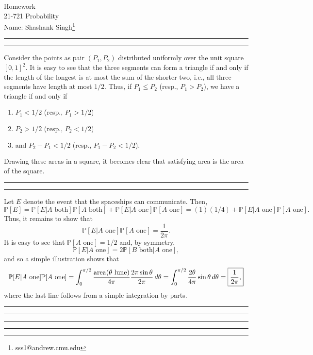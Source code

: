 \documentclass[11pt]{article}
\makeatletter
\newcounter{questionCounter}
\newcounter{partCounter}[questionCounter]
\newenvironment{question}[2][\arabic{questionCounter}]{%
    \setcounter{partCounter}{0}%
    \vspace{.25in} \hrule \vspace{0.5em}%
        \noindent{\bf #2}%
    \vspace{0.8em} \hrule \vspace{.10in}%
    \addtocounter{questionCounter}{1}%
}{}
\newcommand{\myname}{Shashank Singh\footnote{sss1@andrew.cmu.edu}}
\newcommand{\myclass}{21-721 Probability}
\newcommand{\area}{\operatorname{area}}
\renewcommand{\P}{\mathbb{P}}   %
\makeatother
\begin{document}
\thispagestyle{plain}

{\Large Homework} \\
\myclass \\
Name: \myname \\

\begin{question}{EG.1}
Consider the points as pair $(P_1,P_2)$ distributed uniformly over the unit
square $[0,1]^2$. It is easy to see that the three segments can form a triangle
if and only if the length of the longest is at most the sum of the shorter two,
i.e., all three segments have length at most $1/2$. Thus, if $P_1 \leq P_2$
(resp., $P_1 > P_2$), we have a triangle if and only if
\begin{enumerate}
\item $P_1 < 1/2$ (resp., $P_1 > 1/2$)
\item $P_2 > 1/2$ (resp., $P_2 < 1/2$)
\item and $P_2 - P_1 < 1/2$ (resp., $P_1 - P_2 < 1/2$).
\end{enumerate}
Drawing these areas in a square, it becomes clear that satisfying area is
 the area of the square.
\end{question}

\begin{question}{EG.2}
Let $E$ denote the event that the spaceships can communicate. Then,
\[\P[E]
    = \P[E | A \mbox{ both}] \P[A \mbox{ both}]
    + \P[E | A \mbox{ one}] \P[A \mbox{ one}]
    = (1)(1/4)
    + \P[E | A \mbox{ one}] \P[A \mbox{ one}].
\]
Thus, it remains to show that
\[\P[E | A \mbox{ one}] \P[A \mbox{ one}]
    = \frac{1}{2\pi}.
\]
It is easy to see that $\P[A \mbox{ one}] = 1/2$ and, by symmetry,
\[\P[E | A \mbox{ one}]
    = 2 \P[B \mbox{ both} | A \mbox{ one}],
\]
and so a simple illustration shows that
\[\P[E | A \mbox{ one}] \P[A \mbox{ one}]
    = \int_0^{\pi/2} \frac{\area(\theta \mbox{ lune})}{4\pi}
                                    \frac{2\pi\sin\theta}{2\pi}   \, d\theta
    = \int_0^{\pi/2} \frac{2\theta}{4\pi} \sin\theta \, d\theta
    = \mbox{\fbox{$\displaystyle \frac{1}{2\pi}$,}}
\]
where the last line follows from a simple integration by parts.
\end{question}

\begin{question}{EG.3}
\end{question}

\begin{question}{EG.4}
\end{question}
\end{document}
